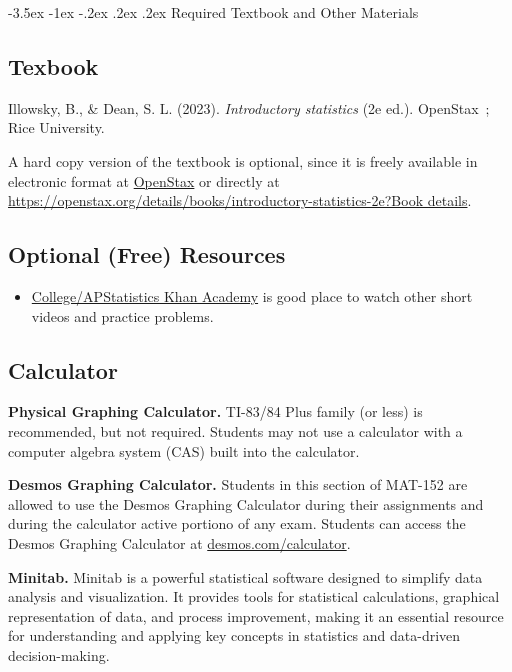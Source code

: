 \documentclass{article}
\makeatletter
\renewcommand\section{\@startsection{section}{1}{0pt}%
  {-3.5ex \@plus -1ex \@minus -.2ex}%
  {.2ex \@plus.2ex}%
  {\normalfont\Large\bfseries}} %
\makeatother
\begin{document}
\section{Required Textbook and Other Materials}

\subsection{Texbook}

Illowsky, B., \& Dean, S. L. (2023). \textit{Introductory statistics} (2e ed.). OpenStax~; Rice University.

A hard copy version of the textbook is optional, since it is freely available in electronic format at \href{https://openstax.org/details/books/introductory-statistics-2e?Book\%20details}{OpenStax} or directly at \href{https://openstax.org/details/books/introductory-statistics-2e?Book\%20details}{https://openstax.org/details/books/introductory-statistics-2e?Book details}.

\subsection{Optional (Free) Resources}

\begin{itemize}
\item \href{https://www.khanacademy.org/math/ap-statistics}{College/AP\texttrademark  Statistics Khan Academy} is good place to watch other short videos and practice problems.
\end{itemize}

\subsection{Calculator}

\textbf{Physical Graphing Calculator.} TI-83/84 Plus family (or less) is recommended, but not required. Students may not use a calculator with a computer algebra system (CAS) built into the calculator.

\textbf{Desmos Graphing Calculator.} Students in this section of MAT-152 are allowed to use the Desmos Graphing Calculator during their assignments and during the calculator active portiono of any exam. Students can access the Desmos Graphing Calculator at \href{https://www.desmos.com/calculator}{desmos.com/calculator}.

\textbf{Minitab.} Minitab is a powerful statistical software designed to simplify data analysis and visualization. It provides tools for statistical calculations, graphical representation of data, and process improvement, making it an essential resource for understanding and applying key concepts in statistics and data-driven decision-making.
\end{document}
